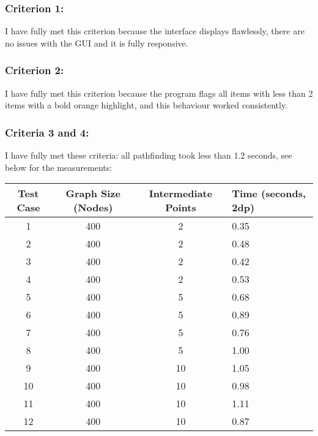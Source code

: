 \subsubsection{Criterion 1:}
I have fully met this criterion because the interface displays flawlessly, there are no issues with the GUI and it is fully responsive.

\subsubsection{Criterion 2:}
I have fully met this criterion because the program flags all items with less than 2 items with a bold orange highlight, and this behaviour worked consistently.

\subsubsection{Criteria 3 and 4:}

I have fully met these criteria: all pathfinding took less than 1.2 seconds, see below for the measurements:

\begin{table}[h!]
	\centering
	\begin{tabularx}{\textwidth}{|c|c|c|X|}
		\hline
		Test Case & Graph Size (Nodes) & Intermediate Points & Time (seconds, 2dp) \\
		\hline
		1         & 400                & 2                   & 0.35              \\
		\hline
		2         & 400                & 2                   & 0.48              \\
		\hline
		3         & 400                & 2                   & 0.42              \\
		\hline
		4         & 400                & 2                   & 0.53              \\
		\hline
		5         & 400                & 5                   & 0.68              \\
		\hline
		6         & 400                & 5                   & 0.89              \\
		\hline
		7         & 400                & 5                   & 0.76              \\
		\hline
		8         & 400                & 5                   & 1.00              \\
		\hline
		9         & 400                & 10                  & 1.05              \\
		\hline
		10        & 400                & 10                  & 0.98              \\
		\hline
		11        & 400                & 10                  & 1.11              \\
		\hline
		12        & 400                & 10                  & 0.87              \\
		\hline
	\end{tabularx}
\end{table}

